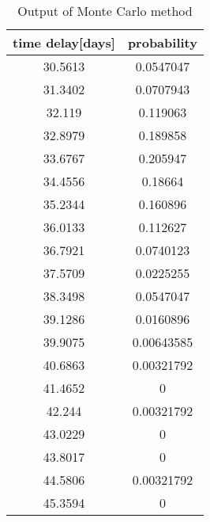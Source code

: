 \begin{table}[htpb]
	\centering
\begin{tabular}{cc}
\toprule
time delay[days] & probability \\
\midrule
\num{30.5613} & \num{0.0547047}\\
\num{31.3402} & \num{0.0707943}\\
\num{32.119} & \num{0.119063}\\
\num{32.8979} & \num{0.189858}\\
\num{33.6767} & \num{0.205947}\\
\num{34.4556} & \num{0.18664}\\
\num{35.2344} & \num{0.160896}\\
\num{36.0133} & \num{0.112627}\\
\num{36.7921} & \num{0.0740123}\\
\num{37.5709} & \num{0.0225255}\\
\num{38.3498} & \num{0.0547047}\\
\num{39.1286} & \num{0.0160896}\\
\num{39.9075} & \num{0.00643585}\\
\num{40.6863} & \num{0.00321792}\\
\num{41.4652} & \num{0}\\
\num{42.244} & \num{0.00321792}\\
\num{43.0229} & \num{0}\\
\num{43.8017} & \num{0}\\
\num{44.5806} & \num{0.00321792}\\
\num{45.3594} & \num{0}\\
\bottomrule
\end{tabular}	
	\caption{Output of Monte Carlo method}
\end{table}
